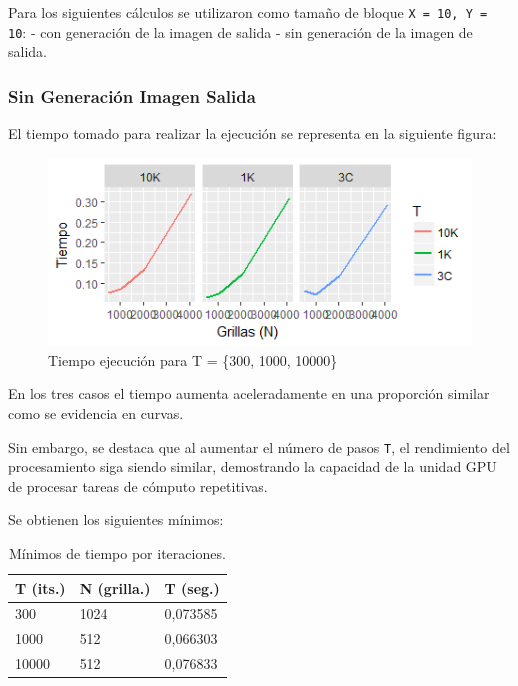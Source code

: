 \documentclass[jou]{apa6}
\begin{document}
Para los siguientes cálculos se utilizaron como tamaño de bloque \texttt{X = 10, Y = 10}:
- con generación de la imagen de salida
- sin generación de la imagen de salida.

\subsubsection{Sin Generación Imagen Salida}
El tiempo tomado para realizar la ejecución se representa en la siguiente figura:

\clearpage

\begin{figure}[h]
	\includegraphics[width=\columnwidth]{time-same-block-size-no-raw.png}
	\caption{Tiempo ejecución para T = \{300, 1000, 10000\}}
	\label{fig:Figure1}
\end{figure}

En los tres casos el tiempo aumenta aceleradamente en una proporción similar como se evidencia en curvas. 

Sin embargo, se destaca que al aumentar el número de pasos \texttt{T}, el rendimiento del procesamiento siga siendo similar, demostrando la capacidad de la unidad GPU de procesar tareas de cómputo repetitivas. 


Se obtienen los siguientes mínimos: 

\begin{table}[h]
\centering
\caption{Mínimos de tiempo por iteraciones.}
\label{my-label}
\begin{tabular}{@{}lll@{}}
\toprule
\multicolumn{1}{c}{T (its.)} & \multicolumn{1}{c}{N (grilla.)} & \multicolumn{1}{c}{T (seg.)} \\ \midrule
300                          & 1024                         & 0,073585                     \\
1000                         & 512                          & 0,066303                     \\
10000                        & 512                          & 0,076833                     \\ \bottomrule
\end{tabular}
\end{table}
\end{document}
